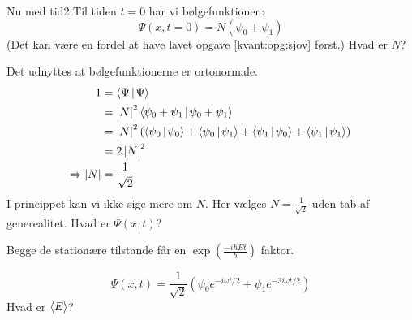 \begin{opgave}{Nu med tid}{2}
Til tiden $t=0$ har vi bølgefunktionen: $$\Psi(x,t=0) = N(\psi_0+\psi_1)$$ (Det kan være en fordel at have lavet opgave \ref{kvant:opg:sjov} først.)
\opg Hvad er $N$?

Det udnyttes at bølgefunktionerne er ortonormale.
\begin{align*}
    1&=\braket{\Psi}{\Psi}\\
    &= \abs N^2 \braket{\psi_0+\psi_1}{\psi_0+\psi_1}\\
    &= \abs N^2 (\braket{\psi_0}{\psi_0}+\braket{\psi_0}{\psi_1}+\braket{\psi_1}{\psi_0}+\braket{\psi_1}{\psi_1})\\
    &= 2\abs N^2\\
    \Rightarrow \abs N &= \frac{1}{\sqrt{2}}
\end{align*}
I princippet kan vi ikke sige mere om $N$. Her vælges $N=\frac{1}{\sqrt{2}}$ uden tab af generealitet.
\opg Hvad er $\Psi(x,t)$?

Begge de stationære tilstande får en $\exp(\frac{-i\hbar Et}{\hbar})$ faktor.

$$
\Psi(x,t) = \frac{1}{\sqrt{2}}\left(\psi_0e^{-i\omega t/2}+\psi_1e^{-3i\omega t/2}\right)
$$
\opg Hvad er $\left< E \right>$?


\end{opgave}
